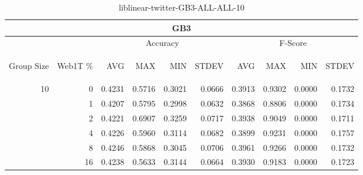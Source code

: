 \begin{center}
\begin{table}[htbp]
\begin{tabular}{ | r | r | r | r | r | r | r | r | r | r |}
\hline
\multicolumn{10}{|c|}{GB3}\\
\hline
 & & \multicolumn{4}{|c|}{Accuracy} & \multicolumn{4}{|c|}{F-Score}\\ \cline{3-10}
\begin{sideways}Group Size\end{sideways} & \begin{sideways}Web1T \%\end{sideways} & \begin{sideways}AVG\end{sideways} & \begin{sideways}MAX\end{sideways} & \begin{sideways}MIN\end{sideways} & \begin{sideways}STDEV\end{sideways} & \begin{sideways}AVG\end{sideways} & \begin{sideways}MAX\end{sideways} & \begin{sideways}MIN\end{sideways} & \begin{sideways}STDEV\end{sideways}\\
\hline
\multirow{6}{*}{10}
 & 0 & 0.4231 & 0.5716 & 0.3021 & 0.0666 & 0.3913 & 0.9302 & 0.0000 & 0.1732\\ \cline{2-10}
 & 1 & 0.4207 & 0.5795 & 0.2998 & 0.0632 & 0.3868 & 0.8806 & 0.0000 & 0.1734\\ \cline{2-10}
 & 2 & 0.4221 & 0.6907 & 0.3259 & 0.0717 & 0.3938 & 0.9049 & 0.0000 & 0.1711\\ \cline{2-10}
 & 4 & 0.4226 & 0.5960 & 0.3114 & 0.0682 & 0.3899 & 0.9231 & 0.0000 & 0.1757\\ \cline{2-10}
 & 8 & 0.4246 & 0.5868 & 0.3045 & 0.0706 & 0.3961 & 0.9266 & 0.0000 & 0.1732\\ \cline{2-10}
 & 16 & 0.4238 & 0.5633 & 0.3144 & 0.0664 & 0.3930 & 0.9183 & 0.0000 & 0.1723\\ \cline{2-10}
\hline
\end{tabular}
\caption{liblinear-twitter-GB3-ALL-ALL-10}
\end{table}
\end{center}

